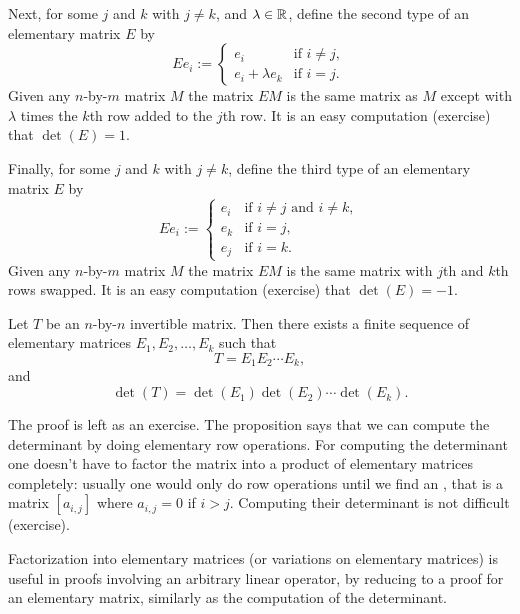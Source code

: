 Next, for some $j$ and $k$ with $j\neq k$, and $\lambda \in {\mathbb{R}}$,
define the second type of an elementary matrix $E$ by
\begin{equation*}
Ee_i := 
\begin{cases}
e_i & \text{if $i \neq j$} , \\
e_i + \lambda e_k & \text{if $i = j$} .
\end{cases}
\end{equation*}
Given any $n$-by-$m$ matrix $M$ the matrix $EM$ is the same matrix as $M$
except with $\lambda$ times the $k$th row added to the $j$th row.
It is an easy computation (exercise) that $\det(E) = 1$.

Finally, for some $j$ and $k$ with $j\neq k$, define
the third type of an elementary matrix $E$ by
\begin{equation*}
Ee_i := 
\begin{cases}
e_i & \text{if $i \neq j$ and $i \neq k$} , \\
e_k & \text{if $i = j$} , \\
e_j & \text{if $i = k$} .
\end{cases}
\end{equation*}
Given any $n$-by-$m$ matrix $M$ the matrix $EM$ is the same matrix with
$j$th and $k$th rows swapped.
It is an easy computation (exercise) that $\det(E) = -1$.

\begin{prop} \label{prop:elemmatrixdecomp}
Let $T$ be an $n$-by-$n$ invertible matrix.  Then there exists a finite
sequence of elementary matrices $E_1, E_2, \ldots, E_k$ such that
\begin{equation*}
T = E_1 E_2 \cdots E_k ,
\end{equation*}
and
\begin{equation*}
\det(T) = \det(E_1)\det(E_2)\cdots \det(E_k) .
\end{equation*}
\end{prop}

The proof is left as an exercise.  The proposition says that we can compute
the determinant by doing elementary row operations.  For computing the
determinant one doesn't have to factor the matrix into a product of
elementary matrices completely: usually one would only do row operations
until we find an \emph{}, that is a matrix
$[a_{i,j}]$ where $a_{i,j} = 0$ if $i > j$.  Computing their determinant is
not difficult (exercise).

Factorization into elementary matrices (or variations on elementary
matrices) is useful in proofs involving an arbitrary linear operator, by
reducing to a proof for an elementary matrix, similarly as the computation
of the determinant.


